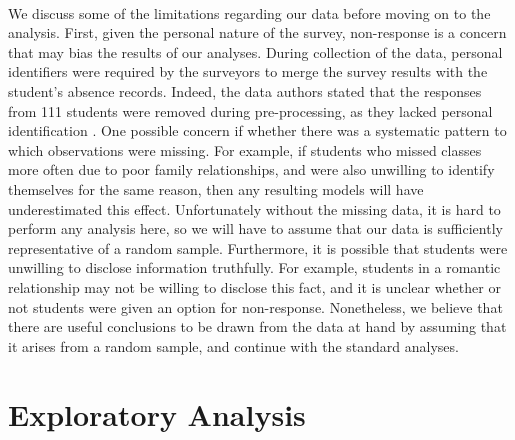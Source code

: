 \documentclass[12pt, titlepage]{article}
\begin{document}
	\paragraph{} We discuss some of the limitations regarding our data before moving on to the analysis. First, given the personal nature of the survey, non-response is a concern that may bias the results of our analyses. During collection of the data, personal identifiers were required by the surveyors to merge the survey results with the student's absence records. Indeed, the data authors stated that the responses from 111 students were removed during pre-processing, as they lacked personal identification \cite{Cortez::2008}. One possible concern if whether there was a systematic pattern to which observations were missing. For example, if students who missed classes more often due to poor family relationships, and were also unwilling to identify themselves for the same reason, then any resulting models will have underestimated this effect. Unfortunately without the missing data, it is hard to perform any analysis here, so we will have to assume that our data is sufficiently representative of a random sample. Furthermore, it is possible that students were unwilling to disclose information truthfully. For example, students in a romantic relationship may not be willing to disclose this fact, and it is unclear whether or not students were given an option for non-response. Nonetheless, we believe that there are useful conclusions to be drawn from the data at hand by assuming that it arises from a random sample, and continue with the standard analyses. 
	
	\section{Exploratory Analysis}
	
\end{document}

